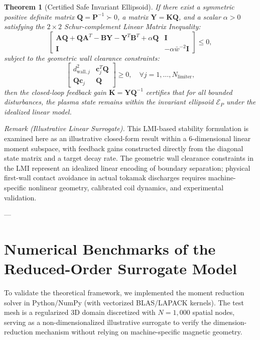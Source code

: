 \documentclass[11pt,a4paper]{article}
\newtheorem{theorem}{Theorem}
\begin{document}
\begin{theorem}[Certified Safe Invariant Ellipsoid]
If there exist a symmetric positive definite matrix $\bm{Q} = \bm{P}^{-1} \succ 0$, a matrix $\bm{Y} = \bm{K} \bm{Q}$, and a scalar $\alpha > 0$ satisfying the $2 \times 2$ Schur-complement Linear Matrix Inequality:
\begin{equation}
    \renewcommand{\arraystretch}{1.35}
    \begin{bmatrix}
        \bm{A}\bm{Q} + \bm{Q}\bm{A}^T - \bm{B}\bm{Y} - \bm{Y}^T\bm{B}^T + \alpha \bm{Q} & \bm{I} \\
        \bm{I} & -\alpha \bar{w}^{-2} \bm{I}
    \end{bmatrix} \le 0,
    \label{eq:lmi_condition}
\end{equation}
subject to the geometric wall clearance constraints:
\begin{equation}
    \renewcommand{\arraystretch}{1.35}
    \begin{bmatrix}
        d_{\mathrm{wall}, j}^2 & \bm{c}_j^T \bm{Q} \\
        \bm{Q} \bm{c}_j & \bm{Q}
    \end{bmatrix} \ge 0, \quad \forall j = 1, \dots, N_{\mathrm{limiter}},
\end{equation}
then the closed-loop feedback gain $\bm{K} = \bm{Y} \bm{Q}^{-1}$ certifies that for all bounded disturbances, the plasma state remains within the invariant ellipsoid $\mathcal{E}_P$ under the idealized linear model.
\end{theorem}

\noindent\textit{Remark (Illustrative Linear Surrogate).}
This LMI-based stability formulation is examined here as an illustrative closed-form result within a 6-dimensional linear moment subspace, with feedback gains constructed directly from the diagonal state matrix and a target decay rate. The geometric wall clearance constraints in the LMI represent an idealized linear encoding of boundary separation; physical first-wall contact avoidance in actual tokamak discharges requires machine-specific nonlinear geometry, calibrated coil dynamics, and experimental validation.

---

\section{Numerical Benchmarks of the Reduced-Order Surrogate Model}

To validate the theoretical framework, we implemented the moment reduction solver in Python/\allowbreak NumPy (with vectorized BLAS/LAPACK kernels). The test mesh is a regularized 3D domain discretized with $N=1{,}000$ spatial nodes, serving as a non-dimensionalized illustrative surrogate to verify the dimension-reduction mechanism without relying on machine-specific magnetic geometry.
\end{document}
